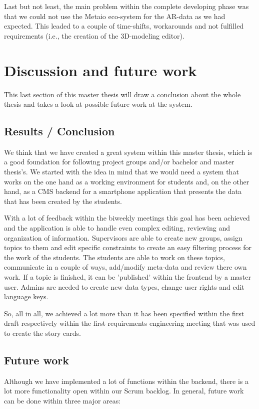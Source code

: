 Last but not least, the main problem within the complete developing phase was that we could not use the Metaio eco-system for the \ac{AR}-data as we had expected. This leaded to a couple of time-shifts, workarounds and not fulfilled requirements (i.e., the creation of the 3D-modeling editor).

\section{Discussion and future work}
This last section of this master thesis will draw a conclusion about the whole thesis and takes a look at possible future work at the system.

\subsection{Results / Conclusion}
We think that we have created a great system within this master thesis, which is a good foundation for following project groups and/or bachelor and master thesis's. We started with the idea in mind that we would need a system that works on the one hand as a working environment for students and, on the other hand, as a \ac{CMS} backend for a smartphone application that presents the data that has been created by the students. 

With a lot of feedback within the biweekly meetings this goal has been achieved and the application is able to handle even complex editing, reviewing and organization of information. Supervisors are able to create new groups, assign topics to them and edit specific constraints to create an easy filtering process for the work of the students. The students are able to work on these topics, communicate in a couple of ways, add/modify meta-data and review there own work. If a topic is finished, it can be 'published' within the frontend by a master user. Admins are needed to create new data types, change user rights and edit language keys.

So, all in all, we achieved a lot more than it has been specified within the first draft respectively within the first requirements engineering meeting that was used to create the story cards.

\subsection{Future work}
\label{futurework}
Although we have implemented a lot of functions within the backend, there is a lot more functionality open within our Scrum backlog. In general, future work can be done within three major areas:


